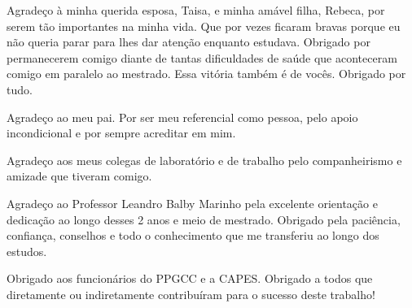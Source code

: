 Agradeço à minha querida esposa, Taisa, e minha amável filha, Rebeca, por serem tão importantes na minha vida. Que por vezes ficaram bravas porque eu não queria parar para lhes dar atenção enquanto estudava. Obrigado por permanecerem comigo diante de tantas dificuldades de saúde que aconteceram comigo em paralelo ao mestrado. Essa vitória também é de vocês. Obrigado por tudo.

Agradeço ao meu pai. Por ser meu referencial como pessoa, pelo apoio incondicional e por sempre acreditar em mim.

Agradeço aos meus colegas de laboratório e de trabalho pelo companheirismo e amizade que tiveram comigo.

Agradeço ao Professor Leandro Balby Marinho pela excelente orientação e dedicação ao longo desses 2 anos e meio de mestrado. Obrigado pela paciência, confiança, conselhos e todo o conhecimento que me transferiu ao longo dos estudos.

Obrigado aos funcionários do PPGCC e a CAPES. Obrigado a todos que diretamente ou indiretamente contribuíram para o sucesso deste trabalho!

